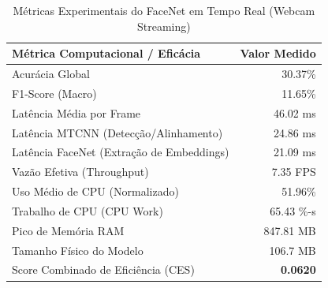 \begin{table}[htbp]
\centering
\caption{Métricas Experimentais do FaceNet em Tempo Real (Webcam Streaming)}
\label{tab:facenet_tempo_real}
\begin{tabular}{lr}
\hline
\textbf{Métrica Computacional / Eficácia} & \textbf{Valor Medido} \\
\hline
Acurácia Global & 30.37\% \\
F1-Score (Macro) & 11.65\% \\
Latência Média por Frame & 46.02 ms \\
Latência MTCNN (Detecção/Alinhamento) & 24.86 ms \\
Latência FaceNet (Extração de Embeddings) & 21.09 ms \\
Vazão Efetiva (Throughput) & 7.35 FPS \\
Uso Médio de CPU (Normalizado) & 51.96\% \\
Trabalho de CPU (CPU Work) & 65.43 \%-s \\
Pico de Memória RAM & 847.81 MB \\
Tamanho Físico do Modelo & 106.7 MB \\
Score Combinado de Eficiência (CES) & \textbf{0.0620} \\
\hline
\end{tabular}
\end{table}
